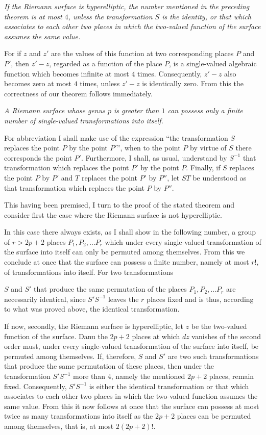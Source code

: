 \documentclass{article}
\begin{document}
\emph{If the Riemann surface is hyperelliptic, the number mentioned in the preceding theorem is at most $4$, unless the transformation $S$ is the identity, or that which associates to each other two places in which the two-valued function of the surface assumes the same value.}

For if $z$ and $z'$ are the values of this function at two corresponding places $P$ and $P'$, then $z' - z$, regarded as a function of the place $P$, is a single-valued algebraic function which becomes infinite at most $4$ times. Consequently, $z' - z$ also becomes zero at most $4$ times, unless $z' - z$ is identically zero. From this the correctness of our theorem follows immediately.

\emph{A Riemann surface whose genus $p$ is greater than $1$ can possess only a finite number of single-valued transformations into itself.}

For abbreviation I shall make use of the expression ``the transformation $S$ replaces the point $P$ by the point $P'$'', when to the point $P$ by virtue of $S$ there corresponds the point $P'$. Furthermore, I shall, as usual, understand by $S^{-1}$ that transformation which replaces the point $P'$ by the point $P$. Finally, if $S$ replaces the point $P$ by $P'$ and $T$ replaces the point $P'$ by $P''$, let $ST$ be understood as that transformation which replaces the point $P$ by $P''$.

This having been premised, I turn to the proof of the stated theorem and consider first the case where the Riemann surface is not hyperelliptic.

In this case there always exists, as I shall show in the following number, a group of $r > 2p+2$ places $P_1, P_2, \dots P_r$ which under every single-valued transformation of the surface into itself can only be permuted among themselves. From this we conclude at once that the surface can possess a finite number, namely at most $r!$, of transformations into itself. For two transformations

$S$ and $S'$ that produce the same permutation of the places $P_1, P_2, \dots P_r$ are necessarily identical, since $S'S^{-1}$ leaves the $r$ places fixed and is thus, according to what was proved above, the identical transformation.

If now, secondly, the Riemann surface is hyperelliptic, let $z$ be the two-valued function of the surface. Danu the $2p+2$ places at which $dz$ vanishes of the second order must, under every single-valued transformation of the surface into itself, be permuted among themselves. If, therefore, $S$ and $S'$ are two such transformations that produce the same permutation of these places, then under the transformation $S'S^{-1}$ more than $4$, namely the mentioned $2p+2$ places, remain fixed. Consequently, $S'S^{-1}$ is either the identical transformation or that which associates to each other two places in which the two-valued function assumes the same value. From this it now follows at once that the surface can possess at most twice as many transformations into itself as the $2p+2$ places can be permuted among themselves, that is, at most $2(2p+2)!$.
\end{document}
